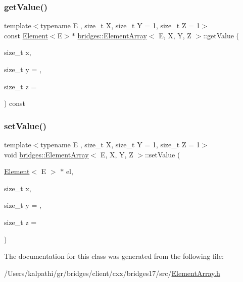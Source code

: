 \mbox{\label{classbridges_1_1_element_array_a9e15557584b74ac7909cac00a2ab4fbe}} 
\subsubsection{\texorpdfstring{get\+Value()}{getValue()}\hspace{0.1cm}{\footnotesize\ttfamily [2/2]}}
{\footnotesize\ttfamily template$<$typename E , size\+\_\+t X, size\+\_\+t Y = 1, size\+\_\+t Z = 1$>$ \\
const \mbox{\hyperlink{classbridges_1_1_element}{Element}}$<$E$>$$\ast$ \mbox{\hyperlink{classbridges_1_1_element_array}{bridges\+::\+Element\+Array}}$<$ E, X, Y, Z $>$\+::get\+Value (\begin{DoxyParamCaption}\item[{size\+\_\+t}]{x,  }\item[{size\+\_\+t}]{y = {},  }\item[{size\+\_\+t}]{z = {} }\end{DoxyParamCaption}) const\hspace{0.3cm}{\ttfamily [inline]}}

\mbox{\label{classbridges_1_1_element_array_a202def849cd345d8b56ebcb31f332d25}} 
\subsubsection{\texorpdfstring{set\+Value()}{setValue()}}
{\footnotesize\ttfamily template$<$typename E , size\+\_\+t X, size\+\_\+t Y = 1, size\+\_\+t Z = 1$>$ \\
void \mbox{\hyperlink{classbridges_1_1_element_array}{bridges\+::\+Element\+Array}}$<$ E, X, Y, Z $>$\+::set\+Value (\begin{DoxyParamCaption}\item[{\mbox{\hyperlink{classbridges_1_1_element}{Element}}$<$ E $>$ $\ast$}]{el,  }\item[{size\+\_\+t}]{x,  }\item[{size\+\_\+t}]{y = {},  }\item[{size\+\_\+t}]{z = {} }\end{DoxyParamCaption})\hspace{0.3cm}{\ttfamily [inline]}}



The documentation for this class was generated from the following file\+:\begin{DoxyCompactItemize}
\item 
/\+Users/kalpathi/gr/bridges/client/cxx/bridges17/src/\mbox{\hyperlink{_element_array_8h}{Element\+Array.\+h}}\end{DoxyCompactItemize}
